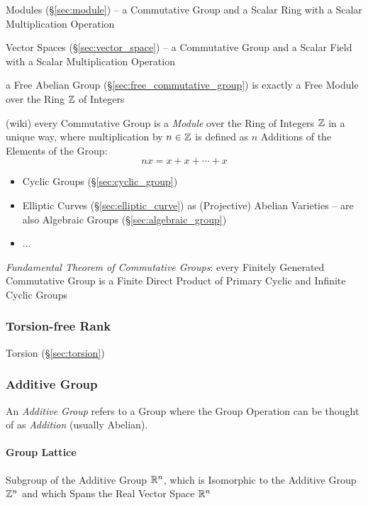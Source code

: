 \fist Modules (\S\ref{sec:module}) -- a Commutative Group and a Scalar Ring with
a Scalar Multiplication Operation

\fist Vector Spaces (\S\ref{sec:vector_space}) -- a Commutative Group and a
Scalar Field with a Scalar Multiplication Operation

\fist a Free Abelian Group (\S\ref{sec:free_commutative_group}) is exactly a
Free Module over the Ring $\mathbb{Z}$ of Integers

(wiki) every Commutative Group is a \emph{Module} over the Ring of Integers
$\mathbb{Z}$ in a unique way, where multiplication by $n \in \mathbb{Z}$ is defined as $n$
Additions of the Elements of the Group:
\[
  n x = x + x + \cdots + x
\]

\begin{itemize}
  \item Cyclic Groups (\S\ref{sec:cyclic_group})
  \item Elliptic Curves (\S\ref{sec:elliptic_curve}) as (Projective) Abelian
    Varieties -- are also Algebraic Groups (\S\ref{sec:algebraic_group})
  \item ...
\end{itemize}

\emph{Fundamental Theorem of Commutative Groups}: every Finitely Generated
Commutative Group is a Finite Direct Product of Primary Cyclic and Infinite
Cyclic Groups



\subsubsection{Torsion-free Rank}\label{sec:torsionfree_rank}

Torsion (\S\ref{sec:torsion})



\subsubsection{Additive Group}\label{sec:additive_group}

An \emph{Additive Group} refers to a Group where the Group Operation
can be thought of as \emph{Addition} (usually Abelian).



\paragraph{Group Lattice}\label{sec:group_lattice}\hfill

Subgroup of the Additive Group $\mathbb{R}^n$, which is Isomorphic to the Additive
Group $\mathbb{Z}^n$ and which Spans the Real Vector Space $\mathbb{R}^n$



